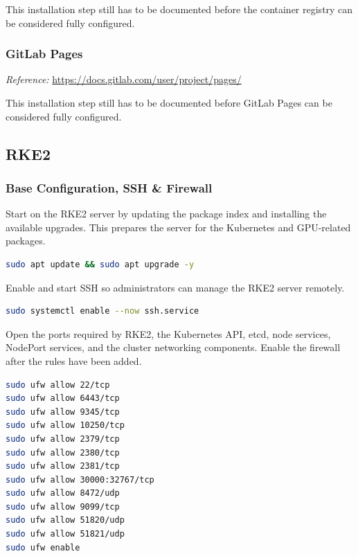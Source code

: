 \documentclass{article}
\begin{document}
This installation step still has to be documented before the container registry can be considered fully configured.

\vspace{0.4cm}
\subsubsection{GitLab Pages}
\noindent\textit{Reference:} \url{https://docs.gitlab.com/user/project/pages/}\par\vspace{0.4cm}

This installation step still has to be documented before GitLab Pages can be considered fully configured.

\subsection{RKE2}

\vspace{0.4cm}
\subsubsection{Base Configuration, SSH \& Firewall}

Start on the RKE2 server by updating the package index and installing the available upgrades. This prepares the server for the Kubernetes and GPU-related packages.

\begin{lstlisting}[language=sh]
sudo apt update && sudo apt upgrade -y
\end{lstlisting}

Enable and start SSH so administrators can manage the RKE2 server remotely.

\begin{lstlisting}[language=sh]
sudo systemctl enable --now ssh.service
\end{lstlisting}

Open the ports required by RKE2, the Kubernetes API, etcd, node services, NodePort services, and the cluster networking components. Enable the firewall after the rules have been added.

\begin{lstlisting}[language=sh]
sudo ufw allow 22/tcp
sudo ufw allow 6443/tcp
sudo ufw allow 9345/tcp
sudo ufw allow 10250/tcp
sudo ufw allow 2379/tcp
sudo ufw allow 2380/tcp
sudo ufw allow 2381/tcp
sudo ufw allow 30000:32767/tcp
sudo ufw allow 8472/udp
sudo ufw allow 9099/tcp
sudo ufw allow 51820/udp
sudo ufw allow 51821/udp
sudo ufw enable
\end{lstlisting}
\end{document}
